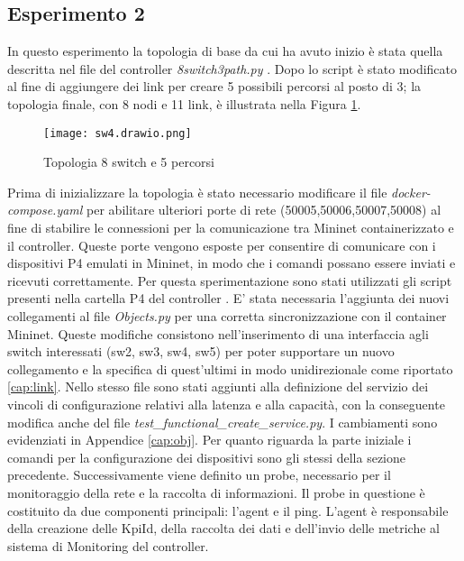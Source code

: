 \subsection{Esperimento 2}
In questo esperimento la topologia di base da cui ha avuto inizio è stata quella descritta nel file del controller \textit{8switch3path.py} \cite{8sw}.
Dopo lo script è stato modificato al fine di aggiungere dei link per creare 5 possibili percorsi al posto di 3; 
la topologia finale, con 8 nodi e 11 link, è illustrata nella Figura \ref{fig:top8}. 
\begin{figure}[h]
    \centering
    \texttt{[image: sw4.drawio.png]}
    \caption{Topologia 8 switch e 5 percorsi}
    \label{fig:top8}
\end{figure}
\newline Prima di inizializzare la topologia è stato necessario modificare il file \textit{docker-compose.yaml}
per abilitare ulteriori porte di rete (50005,50006,50007,50008) al fine di stabilire le connessioni per la comunicazione 
tra Mininet containerizzato e il controller.
Queste porte vengono esposte per consentire di comunicare con i dispositivi P4 emulati in Mininet, in modo che i comandi possano essere inviati e ricevuti correttamente.
\newline Per questa sperimentazione sono stati utilizzati gli script presenti nella cartella P4 del controller \cite{ofc}.
E' stata necessaria l'aggiunta dei nuovi collegamenti al file \textit{Objects.py} per una corretta sincronizzazione con il container Mininet.
Queste modifiche consistono nell'inserimento di una interfaccia agli switch interessati (sw2, sw3, sw4, sw5) per poter 
supportare un nuovo collegamento e la specifica di quest'ultimi in modo unidirezionale come riportato \ref{cap:link}.
Nello stesso file sono stati aggiunti alla definizione del servizio dei vincoli di configurazione relativi alla latenza e alla capacità, con la conseguente modifica anche del file \textit{test\_functional\_create\_service.py}.
I cambiamenti sono evidenziati in Appendice \ref{cap:obj}.
\newline Per quanto riguarda la parte iniziale i comandi per la configurazione dei dispositivi sono gli stessi della sezione precedente.
\newline Successivamente viene definito un probe, necessario per il monitoraggio della rete e la raccolta di informazioni.
Il probe in questione è costituito da due componenti principali: l'agent e il ping.
L'agent è responsabile della creazione delle KpiId, della raccolta dei dati e dell'invio delle metriche al sistema di Monitoring del controller.

